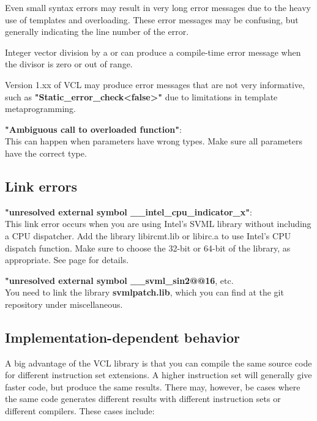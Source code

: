 \documentclass[vcl_manual.tex]{subfiles}
\begin{document}
Even small syntax errors may result in very long error messages due to the heavy use of templates and overloading. These error messages may be confusing, but generally indicating the line number of the error.

Integer vector division by a  or  can produce a compile-time error message when the divisor is zero or out of range.
 
Version 1.xx of VCL may produce error messages that are not very informative, such as 
\textbf{"Static\_error\_check\textless false\textgreater"} due to limitations in template metaprogramming.

\textbf{"Ambiguous call to overloaded function"}: \\
This can happen when parameters have wrong types.
Make sure all parameters have the correct type.


\subsection{Link errors}\label{LinkErrors}

\textbf{"unresolved external symbol \_\_intel\_cpu\_indicator\_x"}: \\
This link error occurs when you are using Intel's SVML library without including a CPU dispatcher. Add the library libircmt.lib or libirc.a to use Intel's  CPU dispatch function. Make sure to choose the 32-bit or 64-bit of the library, as appropriate. See page \pageref{ExternalMathLibrary} for details.

\textbf{"unresolved external symbol \_\_svml\_sin2@@16}, etc. \\
You need to link the library \textbf{svmlpatch.lib}, which you can find at the git repository under miscellaneous.


\subsection{Implementation-dependent behavior}\label{ImplementationDependentBehavior}

A big advantage of the VCL library is that you can compile the same source code for different instruction set extensions. A higher instruction set will generally give faster code, but produce the same results. There may, however, be cases where the same code generates different results with different instruction sets or different compilers. These cases include:
\end{document}
